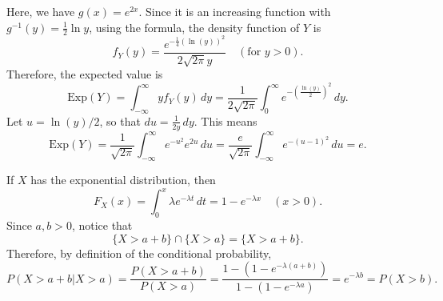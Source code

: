 \begin{problem}
Here, we have $g (x) = e^{2x}$. Since it is an increasing function with $g^{-1} (y) = \frac{1}{2} \ln y$, using the formula, the density function of $Y$ is
    \[
        f_Y (y) = \frac{e^{-\frac{1}{4} (\ln (y))^2}}{2 \sqrt{2\pi} y} \quad (\text{for } y > 0) .
    \]
Therefore, the expected value is
    \[
        \mathrm{Exp} (Y) = \int_{-\infty}^\infty y f_Y (y) \, dy = \frac{1}{2 \sqrt{2\pi}} \int_0^\infty e^{-( \frac{\ln (y)}{2})^2} \, dy .
    \]
Let $u = \ln (y) / 2$, so that $du = \frac{1}{2y} \, dy$. This means
    \[
        \mathrm{Exp} (Y) = \frac{1}{\sqrt{2\pi}} \int_{-\infty}^\infty e^{-u^2}e^{2u} \, du = \frac{e}{\sqrt{2\pi}} \int_{-\infty}^\infty e^{- (u - 1)^2} \, du = e . \tag*{$\square$}
    \]
\end{problem}

\begin{problem}
If $X$ has the exponential distribution, then
    \[
        F_X (x) = \int_0^x \lambda e^{-\lambda t} \, dt = 1 - e^{-\lambda x} \quad (x > 0 ) .
    \]
Since $a, b > 0$, notice that
    \[
        \{ X > a + b \} \cap \{ X > a \} = \{ X > a + b \} .
    \]
Therefore, by definition of the conditional probability,
    \[
        P (X > a + b | X > a ) = \frac{P (X > a + b)}{P (X > a )} = \frac{1 - (1 - e^{-\lambda (a + b)})}{1 - (1 - e^{-\lambda a})} = e^{-\lambda b} = P (X > b ) . \tag*{$\square$}
    \]
\end{problem}




